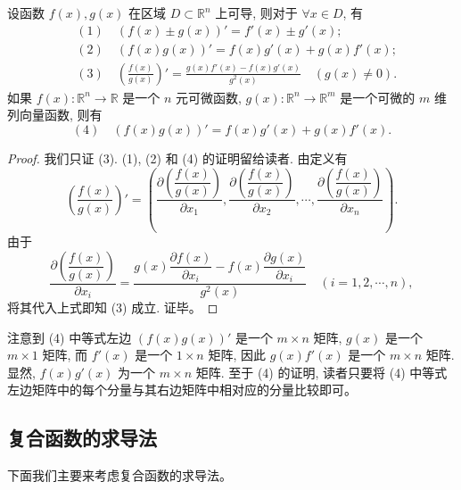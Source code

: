 \documentclass[12pt,fontset=fandol]{ctexart}
\begin{document}
\begin{theorem}\label{course-theorem-14-2-1}\quad 设函数 $f(x),g(x)$ 在区域 $D\subset\mathbb R^n$ 上可导, 则对于 $\forall x\in D$, 有
\[
\begin{aligned}
  &(1)\quad (f(x)\pm g(x))'=f'(x)\pm g'(x);\\
  &(2)\quad (f(x)g(x))'=f(x)g'(x)+g(x)f'(x);\\
  &(3)\quad \left(\frac{f(x)}{g(x)}\right)'=
  \frac{g(x)f'(x)-f(x)g'(x)}{g^2(x)}\quad (g(x)\ne0).
\end{aligned}
\]
如果 $f(x):\mathbb R^n\to\mathbb R$ 是一个 $n$ 元可微函数, $g(x):\mathbb R^n\to\mathbb R^m$ 是一个可微的 $m$ 维列向量函数, 则有
\[
  (4)\quad (f(x)g(x))'=f(x)g'(x)+g(x)f'(x).
\]

\end{theorem}
\begin{proof}\quad 我们只证 (3). (1), (2) 和 (4) 的证明留给读者. 由定义有
\[
  \left(\frac{f(x)}{g(x)}\right)'=
  \left(
    \frac{\partial\left(\dfrac{f(x)}{g(x)}\right)}{\partial x_1},
    \frac{\partial\left(\dfrac{f(x)}{g(x)}\right)}{\partial x_2},
    \cdots,
    \frac{\partial\left(\dfrac{f(x)}{g(x)}\right)}{\partial x_n}
  \right).
\]
由于
\[
  \frac{\partial\left(\dfrac{f(x)}{g(x)}\right)}{\partial x_i}
  =
  \frac{g(x)\dfrac{\partial f(x)}{\partial x_i}-f(x)\dfrac{\partial g(x)}{\partial x_i}}{g^2(x)}
  \quad (i=1,2,\cdots,n),
\]
将其代入上式即知 (3) 成立. 证毕。

\end{proof}
\begin{remark}\quad 注意到 (4) 中等式左边 $(f(x)g(x))'$ 是一个 $m\times n$ 矩阵, $g(x)$ 是一个 $m\times1$ 矩阵, 而 $f'(x)$ 是一个 $1\times n$ 矩阵, 因此 $g(x)f'(x)$ 是一个 $m\times n$ 矩阵. 显然, $f(x)g'(x)$ 为一个 $m\times n$ 矩阵. 至于 (4) 的证明, 读者只要将 (4) 中等式左边矩阵中的每个分量与其右边矩阵中相对应的分量比较即可。

\end{remark}
\subsection{复合函数的求导法}

下面我们主要来考虑复合函数的求导法。
\end{document}
